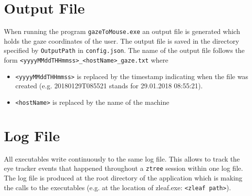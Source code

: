 \documentclass[a4paper,oneside]{book}
\begin{document}
\section{Output File}
When running the program \texttt{gazeToMouse.exe} an output file is generated which holds the gaze coordinates of the user.
The output file is saved in the directory specified by \texttt{OutputPath} in \texttt{config.json}.
The name of the output file follows the form \texttt{<yyyyMMddTHHmmss>\_<hostName>\_gaze.txt} where

\begin{itemize}
    \item \texttt{<yyyyMMddTHHmmss>} is replaced by the timestamp indicating when the file was created (e.g. 20180129T085521 stands for 29.01.2018 08:55:21).
    \item \texttt{<hostName>} is replaced by the name of the machine
\end{itemize}


\section{Log File}
All executables write continuously to the same log file.
This allows to track the eye tracker events that happened throughout a \texttt{ztree} session within one log file.
The log file is produced at the root directory of the application which is making the calls to the executables (e.g. at the location of zleaf.exe: \texttt{<zleaf path>}).
\end{document}
